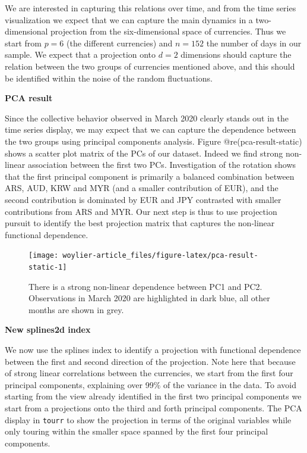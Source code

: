 We are interested in capturing this relations over time, and from the time series visualization we expect that we can capture the main dynamics in a two-dimensional projection from the six-dimensional space of currencies. Thus we start from \(p=6\) (the different currencies) and \(n=152\) the number of days in our sample. We expect that a projection onto \(d=2\) dimensions should capture the relation between the two groups of currencies mentioned above, and this should be identified within the noise of the random fluctuations.

\textbf{PCA result}

Since the collective behavior observed in March 2020 clearly stands out in the time series display, we may expect that we can capture the dependence between the two groups using principal components analysis. Figure @re(pca-result-static)
shows a scatter plot matrix of the PCs of our dataset. Indeed we find strong non-linear association between the first two PCs. Investigation of the rotation shows that the first principal component is primarily a balanced combination between ARS, AUD, KRW and MYR (and a smaller contribution of EUR), and the second contribution is dominated by EUR and JPY contrasted with smaller contributions from ARS and MYR. Our next step is thus to use projection pursuit to identify the best projection matrix that captures the non-linear functional dependence.

\begin{figure}

{\centering \texttt{[image: woylier-article\_files/figure-latex/pca-result-static-1]} 

}

\caption{There is a strong non-linear dependence between PC1 and PC2. Observations in March 2020 are highlighted in dark blue, all other months are shown in grey.}\label{fig:pca-result-static}
\end{figure}

\textbf{New splines2d index}

We now use the splines index to identify a projection with functional dependence between the first and second direction of the projection. Note here that because of strong linear correlations between the currencies, we start from the first four principal components, explaining over 99\% of the variance in the data. To avoid starting from the view already identified in the first two principal components we start from a projections onto the third and forth principal components. The PCA display in \texttt{tourr} to show the projection in terms of the original variables while only touring within the smaller space spanned by the first four principal components.

